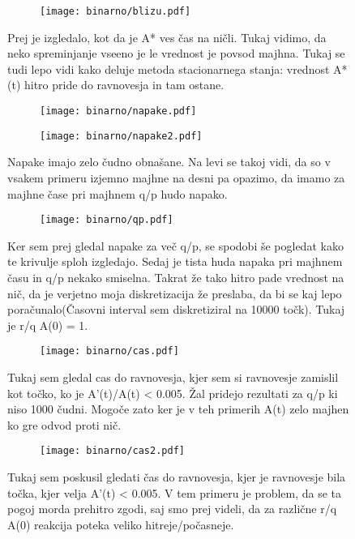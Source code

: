 \documentclass{article}
\begin{document}
\begin{figure}[H]
\centering
\begin{subfigure}{\textwidth}
\texttt{[image: binarno/blizu.pdf]}
\end{subfigure}
\caption*{Prej je izgledalo, kot da je A* ves čas na ničli. Tukaj vidimo, da neko spreminjanje vseeno je le vrednost je povsod majhna. Tukaj se tudi lepo vidi kako deluje metoda stacionarnega stanja: vrednost A*(t) hitro pride do ravnovesja in tam ostane.}
\end{figure}

\begin{figure}[H]
\centering
\begin{subfigure}{.49\textwidth}
\texttt{[image: binarno/napake.pdf]}
\end{subfigure}
\begin{subfigure}{.49\textwidth}
\texttt{[image: binarno/napake2.pdf]}
\end{subfigure}
\caption*{Napake imajo zelo čudno obnašane. Na levi se takoj vidi, da so v vsakem primeru izjemno majhne na desni pa opazimo, da imamo za majhne čase pri majhnem q/p hudo napako.}
\end{figure}

\begin{figure}[H]
\centering
\begin{subfigure}{\textwidth}
\texttt{[image: binarno/qp.pdf]}
\end{subfigure}
\caption*{Ker sem prej gledal napake za več q/p, se spodobi še pogledat kako te krivulje sploh izgledajo. Sedaj je tista huda napaka pri majhnem času in q/p nekako smiselna. Takrat že tako hitro pade vrednost na nič, da je verjetno moja diskretizacija že preslaba, da bi se kaj lepo poračunalo(Časovni interval sem diskretiziral na 10000 točk). Tukaj je r/q A(0) = 1.}
\end{figure}

\begin{figure}[H]
\centering
\begin{subfigure}{\textwidth}
\texttt{[image: binarno/cas.pdf]}
\end{subfigure}
\caption*{Tukaj sem gledal cas do ravnovesja, kjer sem si ravnovesje zamislil kot točko, ko je A'(t)/A(t) < 0.005. Žal pridejo rezultati za q/p ki niso 1000 čudni. Mogoče zato ker je v teh primerih A(t) zelo majhen ko gre odvod proti nič.}
\end{figure}
\begin{figure}[H]
\centering
\begin{subfigure}{\textwidth}
\texttt{[image: binarno/cas2.pdf]}
\end{subfigure}
\caption*{Tukaj sem poskusil gledati čas do ravnovesja, kjer je ravnovesje bila točka, kjer velja A'(t) < 0.005. V tem primeru je problem, da se ta pogoj morda prehitro zgodi, saj smo prej videli, da za različne r/q A(0) reakcija poteka veliko hitreje/počasneje. }
\end{figure}
\newpage
\end{document}

